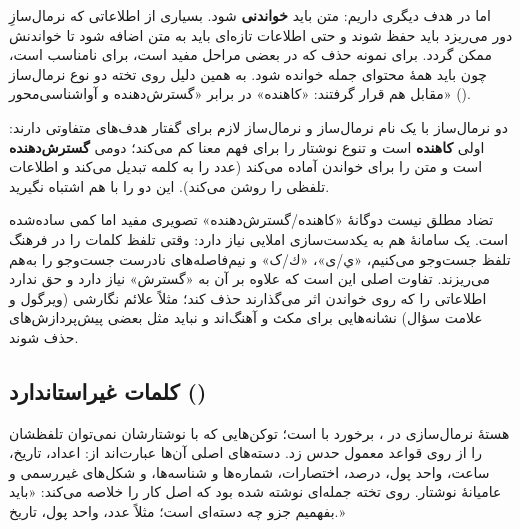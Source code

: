 اما در  هدف دیگری داریم: متن باید \textbf{خواندنی} شود. بسیاری از اطلاعاتی که نرمال‌سازِ  دور می‌ریزد باید حفظ شوند و حتی اطلاعات تازه‌ای باید به متن اضافه شود تا خواندنش ممکن گردد. برای نمونه حذف  که در بعضی مراحل  مفید است، برای  نامناسب است، چون باید همهٔ محتوای جمله خوانده شود. به همین دلیل روی تخته دو نوع نرمال‌ساز مقابل هم قرار گرفتند: «کاهنده» در برابر «گسترش‌دهنده و آواشناسی‌محور» ().

\begin{warningbox}{دو نرمال‌ساز با یک نام}
نرمال‌ساز  و نرمال‌ساز لازم برای گفتار هدف‌های متفاوتی دارند: اولی \textbf{کاهنده} است و تنوع نوشتار را برای فهم معنا کم می‌کند؛ دومی \textbf{گسترش‌دهنده} است و متن را برای خواندن آماده می‌کند (عدد را به کلمه تبدیل می‌کند و اطلاعات تلفظی را روشن می‌کند). این دو را با هم اشتباه نگیرید.
\end{warningbox}

\begin{correctionbox}{تضاد مطلق نیست}
دوگانهٔ «کاهنده/گسترش‌دهنده» تصویری مفید اما کمی ساده‌شده است. یک سامانهٔ  هم به یکدست‌سازی املایی نیاز دارد: وقتی تلفظ کلمات را در فرهنگ تلفظ جست‌وجو می‌کنیم، «ي/ی»، «ك/ک» و نیم‌فاصله‌های نادرست جست‌وجو را به‌هم می‌ریزند. تفاوت اصلی این است که  علاوه بر آن به «گسترش» نیاز دارد و حق ندارد اطلاعاتی را که روی خواندن اثر می‌گذارند حذف کند؛ مثلاً علائم نگارشی (ویرگول و علامت سؤال) نشانه‌هایی برای مکث و آهنگ‌اند و نباید مثل بعضی پیش‌پردازش‌های  حذف شوند.
\end{correctionbox}

\subsection{کلمات غیراستاندارد ()}
هستهٔ نرمال‌سازی در ، برخورد با  است؛ توکن‌هایی که با نوشتارشان نمی‌توان تلفظشان را از روی قواعد معمول حدس زد. دسته‌های اصلی آن‌ها عبارت‌اند از: اعداد، تاریخ، ساعت، واحد پول، درصد، اختصارات، شماره‌ها و شناسه‌ها، و شکل‌های غیررسمی و عامیانهٔ نوشتار. روی تخته جمله‌ای نوشته شده بود که اصل کار را خلاصه می‌کند: «باید بفهمیم جزو چه دسته‌ای است؛ مثلاً عدد، واحد پول، تاریخ.»


